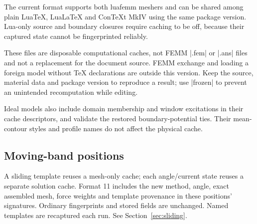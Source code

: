 The current format supports both luafemm meshers and can be shared among
plain LuaTeX, LuaLaTeX and ConTeXt MkIV using the same package version.
Lua-only source and boundary closures require caching to be off, because
their captured state cannot be fingerprinted reliably.

These files are disposable computational caches, not FEMM |.fem| or |.ans|
files and not a replacement for the document source. FEMM exchange and
loading a foreign model without TeX declarations are outside this version.
Keep the source, material data and package version to reproduce a result;
use |frozen| to prevent an unintended recomputation while editing.

Ideal models also include domain membership and window excitations in their
cache descriptors, and validate the restored boundary-potential ties.
Their mean-contour styles and profile names do not affect the physical cache.

\subsection{Moving-band positions}
A sliding template reuses a mesh-only cache; each angle/current state reuses a
separate solution cache. Format 11 includes the new method, angle, exact assembled
mesh, force weights and template provenance in these positions' signatures.
Ordinary fingerprints and stored fields are unchanged. Named templates are
recaptured each run. See Section~\ref{sec:sliding}.
